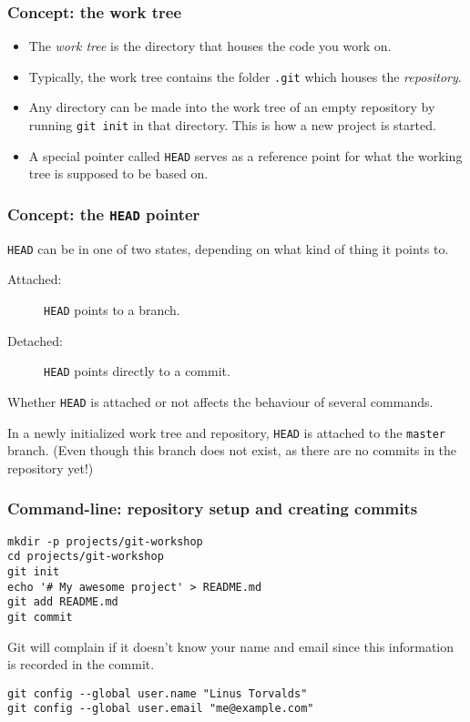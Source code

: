 \documentclass{beamer}
\newcommand{\HEAD}{\texttt{HEAD}}
\begin{document}
\begin{frame}
    \frametitle{Concept: the work tree}

    \begin{itemize}
        \item
            The \emph{work tree} is the directory that houses the code you work
            on.
        \item
            Typically, the work tree contains the folder \texttt{.git} which
            houses the \emph{repository}.
        \item
            Any directory can be made into the work tree of an empty repository
            by running \texttt{git init} in that directory.
            This is how a new project is started.
        \item
            A special pointer called \HEAD{} serves as a reference point for
            what the working tree is supposed to be based on.
    \end{itemize}
\end{frame}

\begin{frame}
    \frametitle{Concept: the \HEAD{} pointer}

    \HEAD{} can be in one of two states, depending on what kind of thing it
    points to.

    \begin{description}
        \item[Attached:] \HEAD{} points to a branch.
        \item[Detached:] \HEAD{} points directly to a commit.
    \end{description}

    Whether \HEAD{} is attached or not affects the behaviour of several
    commands.

    In a newly initialized work tree and repository, \HEAD{} is attached to the
    \texttt{master} branch.
    (Even though this branch does not exist, as there are no commits in the
    repository yet!)
\end{frame}

\begin{frame}[fragile]
    \frametitle{Command-line: repository setup and creating commits}

    \begin{lstlisting}
mkdir -p projects/git-workshop
cd projects/git-workshop
git init
echo '# My awesome project' > README.md
git add README.md
git commit
    \end{lstlisting}

    Git will complain if it doesn't know your name and email since this
    information is recorded in the commit.

    \begin{lstlisting}
git config --global user.name "Linus Torvalds"
git config --global user.email "me@example.com"
    \end{lstlisting}
\end{frame}
\end{document}
